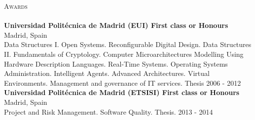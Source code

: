 \documentclass[a4paper]{article}
\newcommand{\lineunder} {
    \vspace*{-8pt} \\
    \hspace*{-18pt} \hrulefill \\
}
\newcommand{\header} [1] {
    {\hspace*{-18pt}\vspace*{6pt} \textsc{#1}}
    \vspace*{-6pt} \lineunder
}
\begin{document}
\vspace*{2mm}

\header{Awards}
\textbf{Universidad Polit\'ecnica de Madrid (EUI) First class or Honours} \hfill Madrid, Spain\\
Data Structures I. Open Systems. Reconfigurable Digital Design. Data Structures II. Fundamentals of Cryptology. Computer Microarchitectures Modelling Using Hardware Description Languages. Real-Time Systems. Operating Systems Administration. Intelligent Agents. Advanced Architectures. Virtual Environments. Management and governance of IT services. Thesis \hfill 2006 - 2012\\
\vspace*{2mm}
\textbf{Universidad Polit\'ecnica de Madrid (ETSISI) First class or Honours} \hfill Madrid, Spain\\
Project and Risk Management. Software Quality. Thesis. \hfill 2013 - 2014\\
\vspace*{2mm}

\ 
\end{document}
